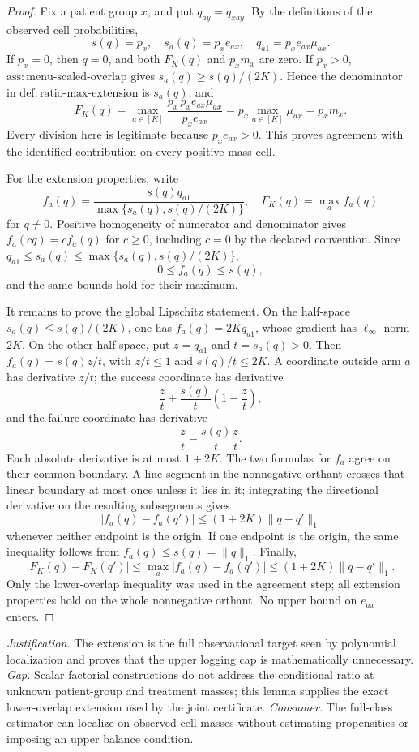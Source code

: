 \documentclass{article}
\begin{document}
\begin{proof}
Fix a patient group \(x\), and put \(q_{ay}=q_{xay}\).  By the definitions of the observed cell probabilities,
\[
 s(q)=p_x,\quad s_a(q)=p_xe_{ax},\quad q_{a1}=p_xe_{ax}\mu_{ax}.
\]
If \(p_x=0\), then \(q=0\), and both \(F_K(q)\) and \(p_xm_x\) are zero.  If \(p_x>0\), \(\mathrm{ass{:}menu\text{-}scaled\text{-}overlap}\) gives \(s_a(q)\geq s(q)/(2K)\).  Hence the denominator in \(\mathrm{def{:}ratio\text{-}max\text{-}extension}\) is \(s_a(q)\), and
\[
 F_K(q)=\max_{a\in[K]}\frac{p_x\,p_xe_{ax}\mu_{ax}}{p_xe_{ax}}
       =p_x\max_{a\in[K]}\mu_{ax}=p_xm_x.
\]
Every division here is legitimate because \(p_xe_{ax}>0\).  This proves agreement with the identified contribution on every positive-mass cell.

For the extension properties, write
\[
 f_a(q)=\frac{s(q)q_{a1}}{\max\{s_a(q),s(q)/(2K)\}},
 \quad F_K(q)=\max_a f_a(q)
\]
for \(q\neq0\).  Positive homogeneity of numerator and denominator gives \(f_a(cq)=cf_a(q)\) for \(c\geq0\), including \(c=0\) by the declared convention.  Since \(q_{a1}\leq s_a(q)\leq\max\{s_a(q),s(q)/(2K)\}\),
\[
 0\leq f_a(q)\leq s(q),
\]
and the same bounds hold for their maximum.

It remains to prove the global Lipschitz statement.  On the half-space \(s_a(q)\leq s(q)/(2K)\), one has \(f_a(q)=2Kq_{a1}\), whose gradient has \(\ell_\infty\)-norm \(2K\).  On the other half-space, put \(z=q_{a1}\) and \(t=s_a(q)>0\).  Then \(f_a(q)=s(q)z/t\), with \(z/t\leq1\) and \(s(q)/t\leq2K\).  A coordinate outside arm \(a\) has derivative \(z/t\); the success coordinate has derivative
\[
 \frac zt+\frac{s(q)}t\left(1-\frac zt\right),
\]
and the failure coordinate has derivative
\[
 \frac zt-\frac{s(q)}t\frac zt.
\]
Each absolute derivative is at most \(1+2K\).  The two formulas for \(f_a\) agree on their common boundary.  A line segment in the nonnegative orthant crosses that linear boundary at most once unless it lies in it; integrating the directional derivative on the resulting subsegments gives
\[
 |f_a(q)-f_a(q')|\leq(1+2K)\|q-q'\|_1
\]
whenever neither endpoint is the origin.  If one endpoint is the origin, the same inequality follows from \(f_a(q)\leq s(q)=\|q\|_1\).  Finally,
\[
 |F_K(q)-F_K(q')|
 \leq\max_a|f_a(q)-f_a(q')|
 \leq(1+2K)\|q-q'\|_1.
\]
Only the lower-overlap inequality was used in the agreement step; all extension properties hold on the whole nonnegative orthant.  No upper bound on \(e_{ax}\) enters.
\end{proof}
\par\smallskip\noindent \textit{Justification.} The extension is the full observational target seen by polynomial localization and proves that the upper logging cap is mathematically unnecessary. \textit{Gap.} Scalar factorial constructions do not address the conditional ratio at unknown patient-group and treatment masses; this lemma supplies the exact lower-overlap extension used by the joint certificate. \textit{Consumer.} The full-class estimator can localize on observed cell masses without estimating propensities or imposing an upper balance condition.
\end{document}
